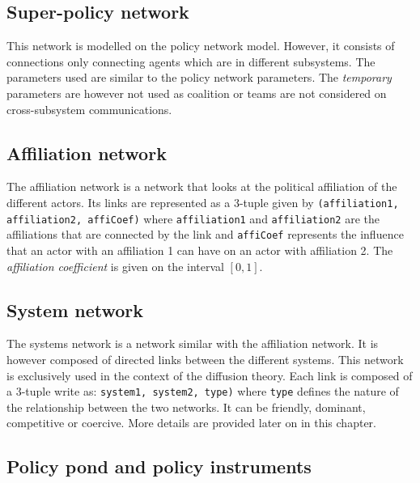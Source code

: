 \subsection{Super-policy network}

This network is modelled on the policy network model. However, it consists of connections only connecting agents which are in different subsystems. The parameters used are similar to the policy network parameters. The \emph{temporary} parameters are however not used as coalition or teams are not considered on cross-subsystem communications.

\subsection{Affiliation network}

The affiliation network is a network that looks at the political affiliation of the different actors. Its links are represented as a 3-tuple given by \texttt{(affiliation1, affiliation2, affiCoef)} where \texttt{affiliation1} and \texttt{affiliation2} are the affiliations that are connected by the link and \texttt{affiCoef} represents the influence that an actor with an affiliation 1 can have on an actor with affiliation 2. The \emph{affiliation coefficient} is given on the interval $[0,1]$.

\subsection{System network}

The systems network is a network similar with the affiliation network. It is however composed of directed links between the different systems. This network is exclusively used in the context of the diffusion theory. Each link is composed of a 3-tuple write as: \texttt{system1, system2, type)} where \texttt{type} defines the nature of the relationship between the two networks. It can be friendly, dominant, competitive or coercive. More details are provided later on in this chapter.


\subsection{Policy pond and policy instruments}

